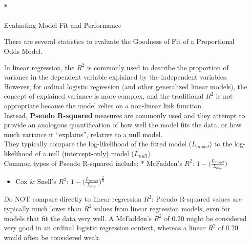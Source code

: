 \documentclass[
  letterpaper,
  DIV=11,
  numbers=noendperiod]{scrartcl}
\let\oldparagraph\paragraph
\renewcommand{\paragraph}[1]{\oldparagraph{#1}\mbox{}}
\providecommand{\tightlist}{%
  \setlength{\itemsep}{0pt}\setlength{\parskip}{0pt}}\usepackage{longtable,booktabs,array}
\begin{document}
\hypertarget{evaluating-model-fit-and-performance}{%
\paragraph*{Evaluating Model Fit and
Performance}\label{evaluating-model-fit-and-performance}}

There are several statistics to evaluate the Goodness of Fit of a
Proportional Odds Model.

In linear regression, the \(R^2\) is commonly used to describe the
proportion of variance in the dependent variable explained by the
independent variables. However, for ordinal logistic regression (and
other generalized linear models), the concept of explained variance is
more complex, and the traditional \(R^2\) is not appropriate because the
model relies on a non-linear link function.\\
Instead, \textbf{Pseudo R-squared} measures are commonly used and they
attempt to provide an analogous quantification of how well the model
fits the data, or how much variance it ``explains'', relative to a null
model.\\
They typically compare the log-likelihood of the fitted model
(\(L_{model}\)) to the log-likelihood of a null (intercept-only) model
(\(L_{null}\)).\\
Common types of Pseudo R-squared include: * McFadden's \(R^2\):
\(1−\Big(\frac{L_{model}}{L_{null}}\Big)\)

\begin{itemize}
\tightlist
\item
  Cox \& Snell's \(R^2\):
  \(1−\Big(\frac{L_{model}}{L_{null}}\Big)^{\frac{2}{n}}\)
\end{itemize}

\begin{tcolorbox}[enhanced jigsaw, arc=.35mm, opacitybacktitle=0.6, breakable, toprule=.15mm, rightrule=.15mm, coltitle=black, opacityback=0, colbacktitle=quarto-callout-warning-color!10!white, title=\textcolor{quarto-callout-warning-color}{\faExclamationTriangle}\hspace{0.5em}{Warning}, colback=white, left=2mm, leftrule=.75mm, bottomrule=.15mm, titlerule=0mm, colframe=quarto-callout-warning-color-frame, toptitle=1mm, bottomtitle=1mm]

Do NOT compare directly to linear regression \(R^2\): Pseudo R-squared
values are typically much lower than \(R^2\) values from linear
regression models, even for models that fit the data very well. A
McFadden's \(R^2\) of 0.20 might be considered very good in an ordinal
logistic regression context, whereas a linear \(R^2\) of 0.20 would
often be considered weak.

\end{tcolorbox}
\end{document}
